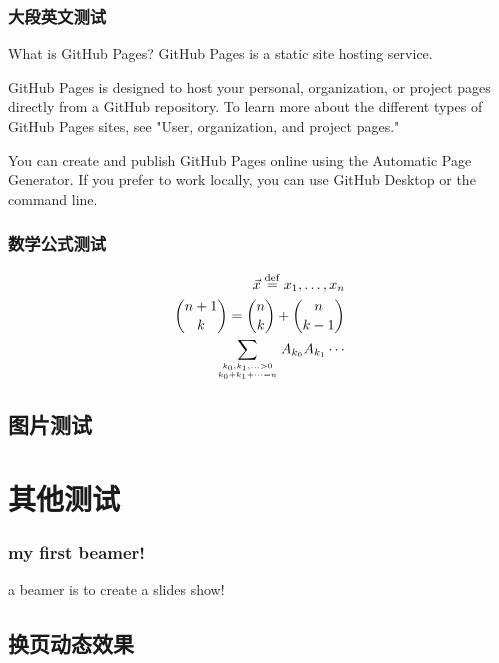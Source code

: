 \documentclass[presentation,11pt]{beamer}
\begin{document}
\begin{frame}
  \frametitle{大段英文测试}
  What is GitHub Pages?
GitHub Pages is a static site hosting service.

GitHub Pages is designed to host your personal, organization, or project pages directly from a GitHub repository. To learn more about the different types of GitHub Pages sites, see "User, organization, and project pages."

You can create and publish GitHub Pages online using the Automatic Page Generator. If you prefer to work locally, you can use GitHub Desktop or the command line.

\end{frame}


\begin{frame}
  \frametitle{数学公式测试}
   \begin{eqnarray*}
                \vec{x}\stackrel{\mathrm{def}}{=}{x_1,\dots,x_n}\\
                {n+1 \choose k}={n \choose k}+{n \choose k-1}\\
                \sum_{k_0,k_1,\ldots>0 \atop k_0+k_1+\cdots=n}A_{k_0}A_{k_1}\cdots
           \end{eqnarray*}

\end{frame}
 
 
\subsection{图片测试} 
 
 
 
\section{其他测试} 
 
 
\begin{frame} 
\frametitle{my first beamer!} 
\begin{definition} 
a \alert{beamer} is to create a slides show! 
\end{definition} 
\end{frame} 
 

 \subsection{换页动态效果}
\end{document}
